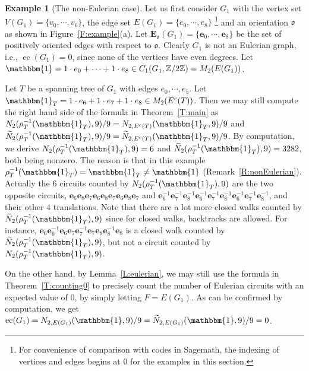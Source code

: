 \documentclass[11pt]{amsart}
\theoremstyle{plain}
\theoremstyle{definition}
\newtheorem{example}[theorem]{Example}
\newcommand{\mbbZ}{{\mathbb Z}}
\newcommand{\mfrako}{{\mathfrak o}}
\newcommand{\ve}{{\mathbf e}}
\newcommand{\vE}{{\mathbf E}}
\DeclareMathOperator{\ec}{\operatorname{ec}}
\numberwithin{equation}{section}
\begin{document}
\begin{example}[The non-Eulerian case] \label{E:non-eulerian}
Let us first  consider $G_1$ with the vertex set $V(G_1)=\{v_0,\cdots,v_6\}$, the edge set $E(G_1)=\{e_0,\cdots,e_8\}$ \footnote{For convenience of comparison with codes in Sagemath, the indexing of vertices and edges begins at $0$ for the examples in this section.} and an orientation $\mfrako$ as shown in Figure~\ref{F:example}(a). Let $\vE_\mfrako(G_1)=\{\ve_0,\cdots,\ve_8\}$ be the set of positively oriented edges with respect to $\mfrako$. Clearly $G_1$ is not an Eulerian graph, i.e., $\ec(G_1)=0$, since none of the vertices have even degrees. Let $\mathbbm{1}= 1\cdot e_0+\cdots+1\cdot e_8 \in C_1(G_1,\mbbZ/2\mbbZ)=M_2(E(G_1))$. 

Let $T$ be a spanning tree of $G_1$ with edges $e_0,\cdots,e_5$. Let  $\mathbbm{1}_T= 1\cdot e_6+1\cdot e_7+1\cdot e_8 \in M_2(E^c(T))$. Then we may still compute the right hand side of the formula in Theorem~\ref{T:main} as 
$N_2(\rho_T^{-1}(\mathbbm{1}_T),9)/9=N_{2,E^c(T)}(\mathbbm{1}_T,9)/9$ and $\widetilde{N}_2(\rho_T^{-1}(\mathbbm{1}_T),9)/9=\widetilde{N}_{2,E^c(T)}(\mathbbm{1}_T,9)/9$. By computation, we derive $N_2(\rho_T^{-1}(\mathbbm{1}_T),9)= 6$ and $\widetilde{N}_2(\rho_T^{-1}(\mathbbm{1}_T),9)=3282$, both being nonzero. The reason is that in this example $\rho_T^{-1}(\mathbbm{1}_T)=\mathbbm{1}_T\neq\mathbbm{1}$ (Remark~\ref{R:nonEulerian}). Actually the 6 circuits counted by $N_2(\rho_T^{-1}(\mathbbm{1}_T),9)$ are the two opposite circuits, $\ve_6\ve_8\ve_7\ve_6\ve_8\ve_7\ve_6\ve_8\ve_7$ and $\ve_6^{-1}\ve_7^{-1}\ve_8^{-1}\ve_6^{-1}\ve_7^{-1}\ve_8^{-1}\ve_6^{-1}\ve_7^{-1}\ve_8^{-1}$, and their other 4 translations. Note that there are a lot more closed walks counted by $\widetilde{N}_2(\rho_T^{-1}(\mathbbm{1}_T),9)$ since for closed walks, backtracks are allowed. For instance, $\ve_6\ve_6^{-1}\ve_6\ve_7\ve_7^{-1}\ve_7\ve_8\ve_8^{-1}\ve_8$ is a closed walk counted by $\widetilde{N}_2(\rho_T^{-1}(\mathbbm{1}_T),9)$, but not a circuit counted by $N_2(\rho_T^{-1}(\mathbbm{1}_T),9)$. 

On the other hand, by Lemma~\ref{L:eulerian}, we may still use the formula in Theorem~\ref{T:counting0} to precisely count the number of Eulerian circuits with an expected value of $0$, by simply letting $F=E(G_1)$. As can be confirmed by computation, we get $\ec(G_1)=N_{2,E(G_1)}(\mathbbm{1},9)/9=\widetilde{N}_{2,E(G_1)}(\mathbbm{1},9)/9=0$. 
\end{example}
\end{document}
